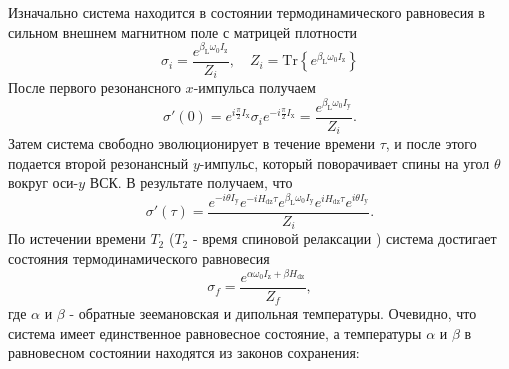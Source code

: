 \documentclass[utf8]{jetp}
\begin{document}
Изначально система находится в состоянии термодинамического равновесия в сильном внешнем магнитном поле с матрицей плотности
%
\begin{equation}
  \label{eq:a1}
  \sigma_{i} = \dfrac{e^{\beta_\mathrm{L} \omega_{0} I_\mathrm{z}}}{Z_{i}} ,
  \quad
  Z_{i} = \mathrm{Tr}\left\{e^{\beta_\mathrm{L} \omega_{0} I_\mathrm{z}} \right\}
\end{equation}
%
После первого резонансного $x$-импульса получаем
%
\begin{equation}
  \label{eq:a2}
  \sigma'(0) = e^{ i \frac \pi 2 I_\mathrm{x}}
  \sigma_{i}
  e^{-i \frac \pi 2 I_\mathrm{x}}
  = \dfrac{e^{\beta_\mathrm{L} \omega_{0} I_\mathrm{y}}}{Z_{i}} .
\end{equation}
%
Затем система свободно эволюционирует в течение времени $\tau$,
и после этого подается второй резонансный $y$-импульс, который поворачивает спины на угол $\theta$ вокруг оси-$y$ ВСК.
В результате получаем, что
\begin{equation}
  \label{eq:a3}
  \sigma'(\tau)
  = \dfrac{
   e^{-i \theta I_\mathrm{y}} e^{-i H_\mathrm{dz} \tau}
   e^{\beta_\mathrm{L} \omega_{0} I_\mathrm{y}}
   e^{i H_\mathrm{dz} \tau} e^{i \theta I_\mathrm{y}}
  }{Z_{i}}.
\end{equation}
%
По истечении времени $T_2$ ($T_2$ - время спиновой релаксации \cite{Goldman_1970}) система достигает состояния термодинамического равновесия
\begin{equation}
  \label{eq:a4}
  \sigma_{f}
  = \dfrac{ e^{\alpha \omega_{0} I_\mathrm{z} + \beta H_\mathrm{dz}} }{Z_f},
\end{equation}
%
где $\alpha$ и $\beta$ - обратные зеемановская и дипольная температуры.
Очевидно, что система имеет единственное  равновесное состояние, а
 температуры $\alpha$ и $\beta$ в равновесном состоянии находятся из
законов сохранения:
\end{document}
